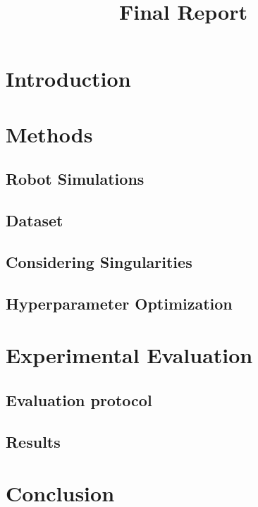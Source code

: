 \documentclass[conference]{IEEEtran}
\begin{document}
\title{Final Report}

\author{
    \and
}

\maketitle

\section*{Introduction}

\section*{Methods}
\subsection*{Robot Simulations}

\subsection*{Dataset}

\subsection*{Considering Singularities}

\subsection*{Hyperparameter Optimization}


\section*{Experimental Evaluation}
\subsection*{Evaluation protocol}

\subsection*{Results}

\section*{Conclusion}


\nocite{*}


\end{document}
